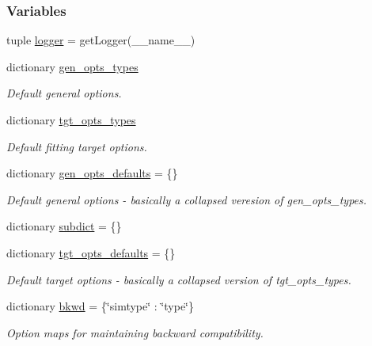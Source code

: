 \subsubsection*{\-Variables}
\begin{DoxyCompactItemize}
\item 
tuple \hyperlink{namespaceforcebalance_1_1parser_a0e0761161c5ff444c7afbcc9157cd710}{logger} = get\-Logger(\-\_\-\-\_\-name\-\_\-\-\_\-)
\item 
dictionary \hyperlink{namespaceforcebalance_1_1parser_a2ac3b892432d1c614c32eebeb8de41c5}{gen\-\_\-opts\-\_\-types}
\begin{DoxyCompactList}\small\item\em \-Default general options. \end{DoxyCompactList}\item 
dictionary \hyperlink{namespaceforcebalance_1_1parser_a1725a6ea3c588046339f9476f3e3f32e}{tgt\-\_\-opts\-\_\-types}
\begin{DoxyCompactList}\small\item\em \-Default fitting target options. \end{DoxyCompactList}\item 
dictionary \hyperlink{namespaceforcebalance_1_1parser_a807ea3a28fedbdfd494f5cc8da063202}{gen\-\_\-opts\-\_\-defaults} = \{\}
\begin{DoxyCompactList}\small\item\em \-Default general options -\/ basically a collapsed veresion of gen\-\_\-opts\-\_\-types. \end{DoxyCompactList}\item 
dictionary \hyperlink{namespaceforcebalance_1_1parser_abb7a7e9723de629aa97727a85bcdbad1}{subdict} = \{\}
\item 
dictionary \hyperlink{namespaceforcebalance_1_1parser_ad2c80e2b742fbd9594fd813dd51550e6}{tgt\-\_\-opts\-\_\-defaults} = \{\}
\begin{DoxyCompactList}\small\item\em \-Default target options -\/ basically a collapsed version of tgt\-\_\-opts\-\_\-types. \end{DoxyCompactList}\item 
dictionary \hyperlink{namespaceforcebalance_1_1parser_a37193d7ceabbf07a61e65677372b7dab}{bkwd} = \{\char`\"{}simtype\char`\"{} \-: \char`\"{}type\char`\"{}\}
\begin{DoxyCompactList}\small\item\em \-Option maps for maintaining backward compatibility. \end{DoxyCompactList}\item 

\end{DoxyCompactItemize}
